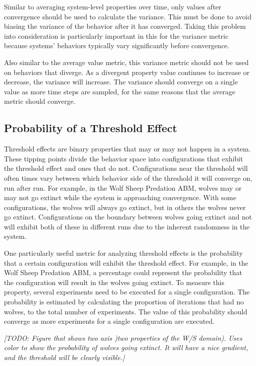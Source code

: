 Similar to averaging system-level properties over time, only values after convergence should be used to calculate the variance.
This must be done to avoid biasing the variance of the behavior after it has converged.
Taking this problem into consideration is particularly important in this for the variance metric because systems' behaviors typically vary significantly before convergence.

Also similar to the average value metric, this variance metric should not be used on behaviors that diverge.
As a divergent property value continues to increase or decrease, the variance will increase.
The variance should converge on a single value as more time steps are sampled, for the same reasons that the average metric should converge.


\subsection{Probability of a Threshold Effect}
Threshold effects are binary properties that may or may not happen in a system.
These tipping points divide the behavior space into configurations that exhibit the threshold effect and ones that do not.
Configurations near the threshold will often times vary between which behavior side of the threshold it will converge on, run after run.
For example, in the Wolf Sheep Predation ABM, wolves may or may not go extinct while the system is approaching convergence.
With some configurations, the wolves will always go extinct, but in others the wolves never go extinct.
Configurations on the boundary between wolves going extinct and not will exhibit both of these in different runs due to the inherent randomness in the system.

One particularly useful metric for analyzing threshold effects is the probability that a certain configuration will exhibit the threshold effect.
For example, in the Wolf Sheep Predation ABM, a percentage could represent the probability that the configuration will result in the wolves going extinct.
To measure this property, several experiments need to be executed for a single configuration. 
The probability is estimated by calculating the proportion of iterations that had no wolves, to the total number of experiments.
The value of this probability should converge as more experiments for a single configuration are executed.

\textit{[TODO: Figure that shows two axis )two properties of the W/S domain). Uses color to show the probability of wolves going extinct. It will have a nice gradient, and the threshold will be clearly visible.]}




